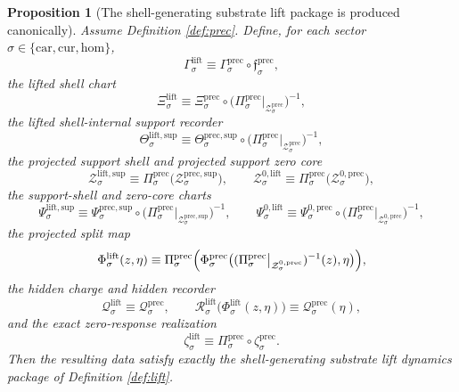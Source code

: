 \documentclass[11pt]{article}
\newcommand{\Car}{\mathrm{car}}
\newcommand{\Cur}{\mathrm{cur}}
\newcommand{\Hom}{\mathrm{hom}}
\newcommand{\LiftSection}[1]{\Gamma_{#1}^{\mathrm{lift}}}
\newcommand{\LiftChart}[1]{\Xi_{#1}^{\mathrm{lift}}}
\newcommand{\LiftSupport}[1]{\Theta_{#1}^{\mathrm{lift,sup}}}
\newcommand{\LiftSupportShell}[1]{\mathcal Z_{#1}^{\mathrm{lift,sup}}}
\newcommand{\LiftZeroCore}[1]{\mathcal Z_{#1}^{0,\mathrm{lift}}}
\newcommand{\LiftEqChart}[1]{\Psi_{#1}^{\mathrm{lift,sup}}}
\newcommand{\LiftZeroChart}[1]{\Psi_{#1}^{0,\mathrm{lift}}}
\newcommand{\LiftSplit}[1]{\Phi_{#1}^{\mathrm{lift}}}
\newcommand{\LiftCharge}[1]{\mathcal Q_{#1}^{\mathrm{lift}}}
\newcommand{\LiftResidual}[1]{\mathcal R_{#1}^{\mathrm{lift}}}
\newcommand{\LiftEmbed}[1]{\zeta_{#1}^{\mathrm{lift}}}
\newcommand{\PrecProj}[1]{\Pi_{#1}^{\mathrm{prec}}}
\newcommand{\PrecLiftMin}[1]{\mathfrak f_{#1}^{\mathrm{prec}}}
\newcommand{\PrecSection}[1]{\Gamma_{#1}^{\mathrm{prec}}}
\newcommand{\PrecShellSet}[1]{\mathcal Z_{#1}^{\mathrm{prec}}}
\newcommand{\PrecChart}[1]{\Xi_{#1}^{\mathrm{prec}}}
\newcommand{\PrecSupport}[1]{\Theta_{#1}^{\mathrm{prec,sup}}}
\newcommand{\PrecSupportShell}[1]{\mathcal Z_{#1}^{\mathrm{prec,sup}}}
\newcommand{\PrecZeroCore}[1]{\mathcal Z_{#1}^{0,\mathrm{prec}}}
\newcommand{\PrecEqChart}[1]{\Psi_{#1}^{\mathrm{prec,sup}}}
\newcommand{\PrecZeroChart}[1]{\Psi_{#1}^{0,\mathrm{prec}}}
\newcommand{\PrecSplit}[1]{\Phi_{#1}^{\mathrm{prec}}}
\newcommand{\PrecCharge}[1]{\mathcal Q_{#1}^{\mathrm{prec}}}
\newcommand{\PrecEmbed}[1]{\zeta_{#1}^{\mathrm{prec}}}
\newtheorem{proposition}{Proposition}
\begin{document}
\begin{proposition}[The shell-generating substrate lift package is produced canonically]
\label{prop:lift}
Assume Definition \ref{def:prec}. Define, for each sector \(\sigma\in\{\Car,\Cur,\Hom\}\),
\begin{equation}
\LiftSection{\sigma}
\equiv
\PrecSection{\sigma}\circ\PrecLiftMin{\sigma},
\label{eq:propinducedliftsection}
\end{equation}
the lifted shell chart
\begin{equation}
\LiftChart{\sigma}
\equiv
\PrecChart{\sigma}\circ
\bigl(\PrecProj{\sigma}\big|_{\PrecShellSet{\sigma}}\bigr)^{-1},
\label{eq:propinducedliftchart}
\end{equation}
the lifted shell-internal support recorder
\begin{equation}
\LiftSupport{\sigma}
\equiv
\PrecSupport{\sigma}\circ
\bigl(\PrecProj{\sigma}\big|_{\PrecShellSet{\sigma}}\bigr)^{-1},
\label{eq:propinducedliftsupport}
\end{equation}
the projected support shell and projected support zero core
\begin{equation}
\LiftSupportShell{\sigma}
\equiv
\PrecProj{\sigma}\bigl(\PrecSupportShell{\sigma}\bigr),
\qquad
\LiftZeroCore{\sigma}
\equiv
\PrecProj{\sigma}\bigl(\PrecZeroCore{\sigma}\bigr),
\label{eq:propinducedshells}
\end{equation}
the support-shell and zero-core charts
\begin{equation}
\LiftEqChart{\sigma}
\equiv
\PrecEqChart{\sigma}\circ
\bigl(\PrecProj{\sigma}\big|_{\PrecSupportShell{\sigma}}\bigr)^{-1},
\qquad
\LiftZeroChart{\sigma}
\equiv
\PrecZeroChart{\sigma}\circ
\bigl(\PrecProj{\sigma}\big|_{\PrecZeroCore{\sigma}}\bigr)^{-1},
\label{eq:propinducedcharts}
\end{equation}
the projected split map
\begin{equation}
\LiftSplit{\sigma}(z,\eta)
\equiv
\PrecProj{\sigma}\Bigl(
\PrecSplit{\sigma}\bigl(
(\PrecProj{\sigma}\big|_{\PrecZeroCore{\sigma}})^{-1}(z),
\eta
\bigr)
\Bigr),
\label{eq:propinducedsplit}
\end{equation}
the hidden charge and hidden recorder
\begin{equation}
\LiftCharge{\sigma}
\equiv
\PrecCharge{\sigma},
\qquad
\LiftResidual{\sigma}\bigl(\LiftSplit{\sigma}(z,\eta)\bigr)
\equiv
\PrecCharge{\sigma}(\eta),
\label{eq:propinducedresidual}
\end{equation}
and the exact zero-response realization
\begin{equation}
\LiftEmbed{\sigma}
\equiv
\PrecProj{\sigma}\circ\PrecEmbed{\sigma}.
\label{eq:propinducedembed}
\end{equation}
Then the resulting data satisfy exactly the shell-generating substrate lift dynamics package of Definition \ref{def:lift}.
\end{proposition}
\end{document}
